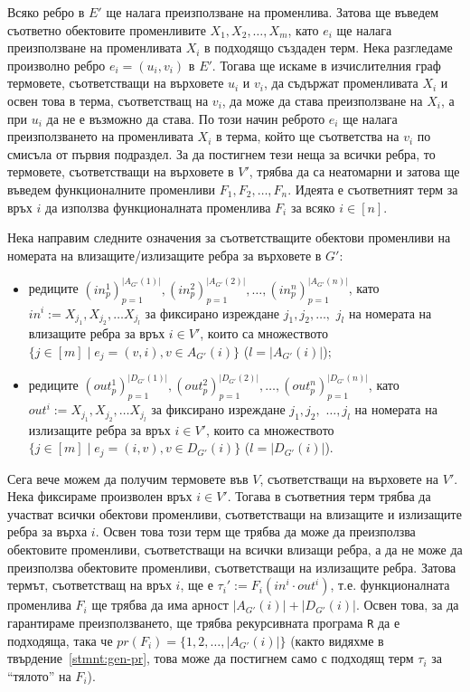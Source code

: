 \documentclass[12pt,twoside,a4paper]{article}
\begin{document}
\begin{theorem}
		Всяко ребро в $E'$ ще налага преизползване на променлива. Затова ще въведем съответно обектовите променливите $X_1, X_2, \dots, X_m$, като $e_i$ ще налага преизползване на променливата $X_i$ в подходящо създаден терм. Нека разгледаме произволно ребро $e_i=(u_i, v_i)$ в $E'$. Тогава ще искаме в изчислителния граф термовете, съответстващи на върховете $u_i$ и $v_i$, да съдържат променливата $X_i$ и освен това в терма, съответстващ на $v_i$, да може да става преизползване на $X_i$, а при $u_i$ да не е възможно да става. По този начин реброто $e_i$ ще налага преизползването на променливата $X_i$ в терма, който ще съответства на $v_i$ по смисъла от първия подраздел. За да постигнем тези неща за всички ребра, то термовете, съответстващи на върховете в $V'$, трябва да са неатомарни и затова ще въведем функционалните променливи $F_1, F_2, \dots, F_n$. Идеята е съответният терм за връх $i$ да използва функционалната променлива $F_i$ за всяко $i \in [n]$.
		
		Нека направим следните означения за съответстващите обектови променливи на номерата на влизащите/излизащите ребра за върховете в $G'$:
		\begin{itemize}
			\item редиците $(in_p^1)_{p=1}^{|A_{G'}(1)|}, (in_p^2)_{p=1}^{|A_{G'}(2)|}, \dots, (in_p^n)_{p=1}^{|A_{G'}(n)|}$, като $in^i := X_{j_1}, X_{j_2}, \dots X_{j_l}$ за фиксирано изреждане $j_1, j_2,\dots,$ $j_l$ на номерата на влизащите ребра за връх $i \in V'$, които са множеството $\{j \in [m] \mid e_j=(v, i), v \in A_{G'}(i)\}$ ($l = |A_{G'}(i)|$);
			\item редиците $(out_p^1)_{p=1}^{|D_{G'}(1)|}, (out_p^2)_{p=1}^{|D_{G'}(2)|}, \dots, (out_p^n)_{p=1}^{|D_{G'}(n)|}$, като $out^i := X_{j_1}, X_{j_2}, \dots X_{j_l}$ за фиксирано изреждане $j_1, j_2,$ $\dots,j_l$ на номерата на излизащите ребра за връх $i \in V'$, които са множеството $\{j \in [m] \mid e_j=(i, v), v \in D_{G'}(i)\}$ ($l = |D_{G'}(i)|$).
		\end{itemize}
		
		Сега вече можем да получим термовете във $V$, съответстващи на върховете на $V'$. Нека фиксираме произволен връх $i \in V'$. Тогава в съответния терм трябва да участват всички обектови променливи, съответстващи на влизащите и излизащите ребра за върха $i$. Освен това този терм ще трябва да може да преизползва обектовите променливи, съответстващи на всички влизащи ребра, а да не може да преизползва обектовите променливи, съответстващи на излизащите ребра. Затова термът, съответстващ на връх $i$, ще е $\tau_i':=F_i(in^i \cdot out^i)$, т.е. функционалната променлива $F_i$ ще трябва да има арност $|A_{G'}(i)|+|D_{G'}(i)|$. Освен това, за да гарантираме преизползването, ще трябва рекурсивната програма \texttt{R} да е подходяща, така че $pr(F_i)=\{1, 2, \dots, |A_{G'}(i)|\}$ (както видяхме в твърдение~\ref{stmnt:gen-pr}, това може да постигнем само с подходящ терм $\tau_i$ за "`тялото"' на $F_i$).
		

\end{theorem}
\end{document}
